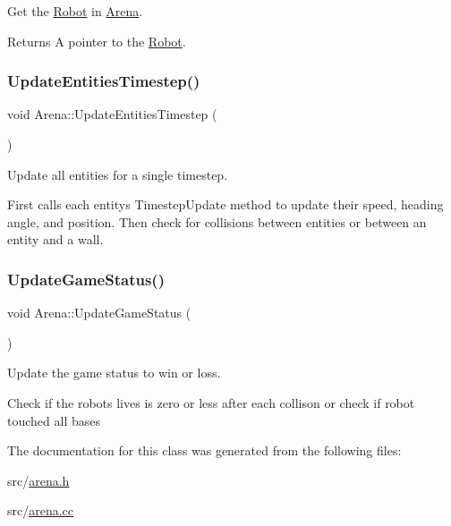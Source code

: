 Get the \mbox{\hyperlink{class_robot}{Robot}} in \mbox{\hyperlink{class_arena}{Arena}}. 

\begin{DoxyReturn}{Returns}
A pointer to the \mbox{\hyperlink{class_robot}{Robot}}. 
\end{DoxyReturn}
\mbox{\label{class_arena_a682ec81cb30e36e5bb801b3388bcb494}} 
\subsubsection{\texorpdfstring{Update\+Entities\+Timestep()}{UpdateEntitiesTimestep()}}
{\footnotesize\ttfamily void Arena\+::\+Update\+Entities\+Timestep (\begin{DoxyParamCaption}{ }\end{DoxyParamCaption})}



Update all entities for a single timestep. 

First calls each entity\textquotesingle{}s Timestep\+Update method to update their speed, heading angle, and position. Then check for collisions between entities or between an entity and a wall. \mbox{\label{class_arena_a700c436c43cd6c692b0e357dac94c507}} 
\subsubsection{\texorpdfstring{Update\+Game\+Status()}{UpdateGameStatus()}}
{\footnotesize\ttfamily void Arena\+::\+Update\+Game\+Status (\begin{DoxyParamCaption}{ }\end{DoxyParamCaption})}



Update the game status to win or loss. 

Check if the robots lives is zero or less after each collison or check if robot touched all bases 

The documentation for this class was generated from the following files\+:\begin{DoxyCompactItemize}
\item 
src/\mbox{\hyperlink{arena_8h}{arena.\+h}}\item 
src/\mbox{\hyperlink{arena_8cc}{arena.\+cc}}\end{DoxyCompactItemize}

